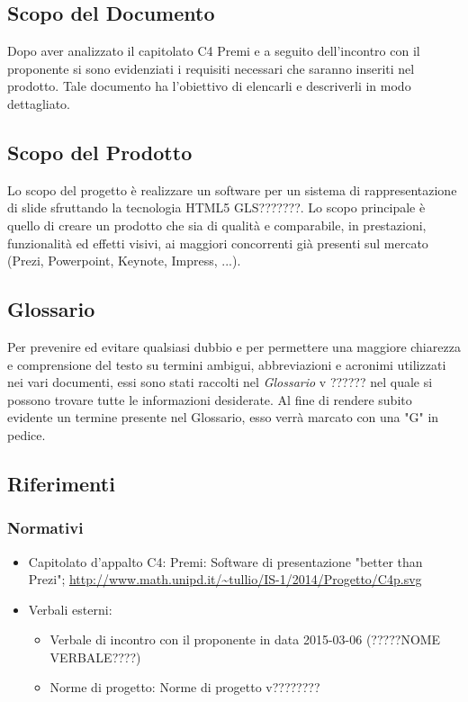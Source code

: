 \subsection{Scopo del Documento}
Dopo aver analizzato il capitolato C4 Premi e a seguito dell'incontro con il proponente si sono evidenziati i requisiti
necessari che saranno inseriti nel prodotto. Tale documento ha l'obiettivo di elencarli e descriverli in modo dettagliato.

\subsection{Scopo del Prodotto}
Lo scopo del progetto è realizzare un software per un sistema di rappresentazione di slide sfruttando la tecnologia HTML5 GLS???????.
Lo scopo principale è quello di creare un prodotto che sia di qualità e comparabile, in prestazioni, funzionalità ed 
effetti visivi, ai maggiori concorrenti già presenti sul mercato (Prezi, Powerpoint, Keynote, Impress, ...).

\subsection{Glossario}
Per prevenire ed evitare qualsiasi dubbio e per permettere una maggiore chiarezza e
comprensione del testo su termini ambigui, abbreviazioni e acronimi utilizzati nei vari documenti,
essi sono stati raccolti nel \textit{Glossario} v ?????? nel quale si possono trovare tutte le informazioni desiderate.
Al fine di rendere subito evidente un termine presente nel Glossario, esso verrà marcato con una "G" in pedice.

\subsection{Riferimenti}
\subsubsection{Normativi}
\begin{itemize}
	\item Capitolato d'appalto C4: Premi: Software di presentazione "better than Prezi";
	\newline \url{http://www.math.unipd.it/~tullio/IS-1/2014/Progetto/C4p.svg}
	\item Verbali esterni:
	\begin{itemize}
		\item Verbale di incontro con il proponente in data 2015-03-06 (?????NOME VERBALE????)
		\item Norme di progetto: Norme di progetto v????????
	\end{itemize}
\end{itemize}
